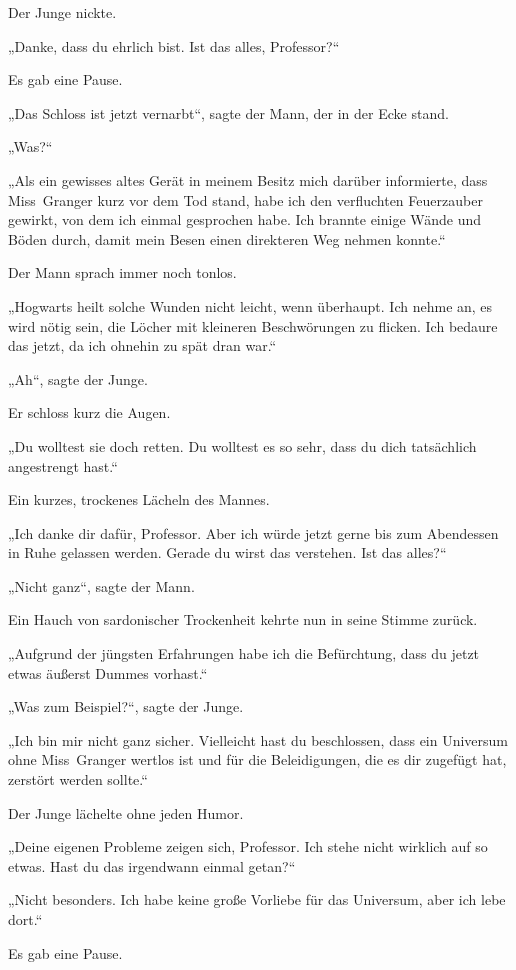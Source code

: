 {Der Junge nickte.

„Danke, dass du ehrlich bist. Ist das alles, Professor?“

Es gab eine Pause.

„Das Schloss ist jetzt vernarbt“, sagte der Mann, der in der Ecke stand.

„Was?“

„Als ein gewisses altes Gerät in meinem Besitz mich darüber informierte, dass Miss~Granger kurz vor dem Tod stand, habe ich den verfluchten Feuerzauber gewirkt, von dem ich einmal gesprochen habe. Ich brannte einige Wände und Böden durch, damit mein Besen einen direkteren Weg nehmen konnte.“

Der Mann sprach immer noch tonlos.

„Hogwarts heilt solche Wunden nicht leicht, wenn überhaupt. Ich nehme an, es wird nötig sein, die Löcher mit kleineren Beschwörungen zu flicken. Ich bedaure das jetzt, da ich ohnehin zu spät dran war.“

„Ah“, sagte der Junge.

Er schloss kurz die Augen.

„Du wolltest sie doch retten. Du wolltest es so sehr, dass du dich tatsächlich angestrengt hast.“

Ein kurzes, trockenes Lächeln des Mannes.

„Ich danke dir dafür, Professor. Aber ich würde jetzt gerne bis zum Abendessen in Ruhe gelassen werden. Gerade du wirst das verstehen. Ist das alles?“

„Nicht ganz“, sagte der Mann.

Ein Hauch von sardonischer Trockenheit kehrte nun in seine Stimme zurück.

„Aufgrund der jüngsten Erfahrungen habe ich die Befürchtung, dass du jetzt etwas äußerst Dummes vorhast.“

„Was zum Beispiel?“, sagte der Junge.

„Ich bin mir nicht ganz sicher. Vielleicht hast du beschlossen, dass ein Universum ohne Miss~Granger wertlos ist und für die Beleidigungen, die es dir zugefügt hat, zerstört werden sollte.“

Der Junge lächelte ohne jeden Humor.

„Deine eigenen Probleme zeigen sich, Professor. Ich stehe nicht wirklich auf so etwas. Hast du das irgendwann einmal getan?“

„Nicht besonders. Ich habe keine große Vorliebe für das Universum, aber ich lebe dort.“

Es gab eine Pause.

}
